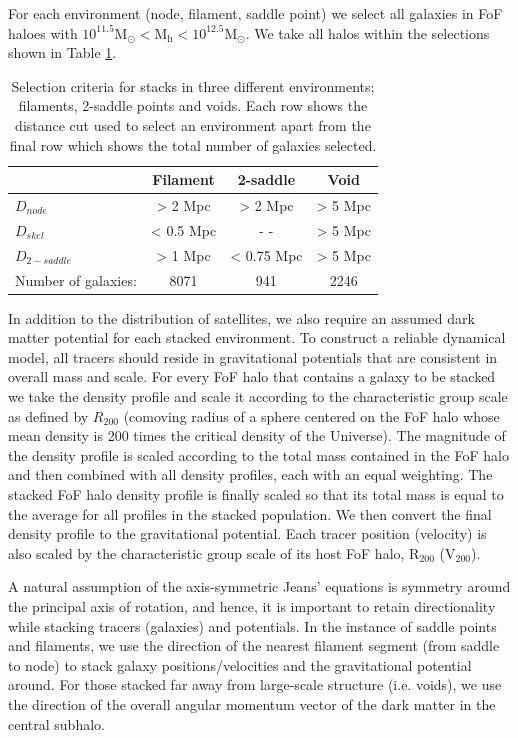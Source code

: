 For each environment (node, filament, saddle point) we select all galaxies in FoF haloes with $\mathrm{10^{11.5} M_{\odot} < M_{h} < 10^{12.5} M_{\odot}}$. We take all halos within the selections shown in Table \ref{tab:stacking}. 

\begin{table}
\centering
\begin{tabular}{|l|c|c|c|}
\hline
& Filament & 2-saddle & Void \\ \hline
$D_{node}$ & > 2 Mpc & > 2 Mpc & > 5 Mpc \\
$D_{skel}$ & < 0.5 Mpc  & - - & > 5 Mpc \\
$D_{2-saddle}$ & > 1 Mpc & < 0.75 Mpc & > 5 Mpc \\
Number of galaxies: & 8071 & 941 & 2246 \\
\hline
\end{tabular}
\caption{Selection criteria for stacks in three different environments; filaments, 2-saddle points and voids. Each row shows the distance cut used to select an environment apart from the final row which shows the total number of galaxies selected.}
\label{tab:stacking}
\end{table}

In addition to the distribution of satellites, we also require an assumed dark matter potential for each stacked environment. To construct a reliable dynamical model, all tracers should reside in gravitational potentials that are consistent in overall mass and scale. For every FoF halo that contains a galaxy to be stacked we take the density profile and scale it according to the characteristic group scale as defined by $R_{200}$ (comoving radius of a sphere centered on the FoF halo whose mean density is 200 times the critical density of the Universe). The magnitude of the density profile is scaled according to the total mass contained in the FoF halo and then combined with all density profiles, each with an equal weighting. The stacked FoF halo density profile is finally scaled so that its total mass is equal to the average for all profiles in the stacked population. We then convert the final density profile to the gravitational potential. Each tracer position (velocity) is also scaled by the characteristic group scale of its host FoF halo, $\mathrm{R_{200}}$ ($\mathrm{V_{200}}$).

A natural assumption of the axis-symmetric Jeans' equations is symmetry around the principal axis of rotation, and hence, it is important to retain directionality while stacking tracers (galaxies) and potentials. In the instance of saddle points and filaments, we use the direction of the nearest filament segment (from saddle to node) to stack galaxy positions/velocities and the gravitational potential around. For those stacked far away from large-scale structure (i.e. voids), we use the direction of the overall angular momentum vector of the dark matter in the central subhalo.

